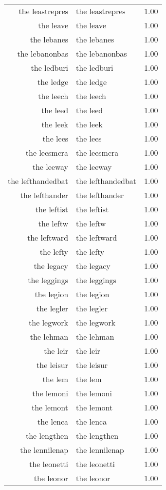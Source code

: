 \begin{table}[ht]
\begin{tabular}{rlr}
  the leastrepres & the leastrepres & 1.00 \\ 
  the leave & the leave & 1.00 \\ 
  the lebanes & the lebanes & 1.00 \\ 
  the lebanonbas & the lebanonbas & 1.00 \\ 
  the ledburi & the ledburi & 1.00 \\ 
  the ledge & the ledge & 1.00 \\ 
  the leech & the leech & 1.00 \\ 
  the leed & the leed & 1.00 \\ 
  the leek & the leek & 1.00 \\ 
  the lees & the lees & 1.00 \\ 
  the leesmcra & the leesmcra & 1.00 \\ 
  the leeway & the leeway & 1.00 \\ 
  the lefthandedbat & the lefthandedbat & 1.00 \\ 
  the lefthander & the lefthander & 1.00 \\ 
  the leftist & the leftist & 1.00 \\ 
  the leftw & the leftw & 1.00 \\ 
  the leftward & the leftward & 1.00 \\ 
  the lefty & the lefty & 1.00 \\ 
  the legacy & the legacy & 1.00 \\ 
  the leggings & the leggings & 1.00 \\ 
  the legion & the legion & 1.00 \\ 
  the legler & the legler & 1.00 \\ 
  the legwork & the legwork & 1.00 \\ 
  the lehman & the lehman & 1.00 \\ 
  the leir & the leir & 1.00 \\ 
  the leisur & the leisur & 1.00 \\ 
  the lem & the lem & 1.00 \\ 
  the lemoni & the lemoni & 1.00 \\ 
  the lemont & the lemont & 1.00 \\ 
  the lenca & the lenca & 1.00 \\ 
  the lengthen & the lengthen & 1.00 \\ 
  the lennilenap & the lennilenap & 1.00 \\ 
  the leonetti & the leonetti & 1.00 \\ 
  the leonor & the leonor & 1.00 \\ 

\end{tabular}
\end{table}
